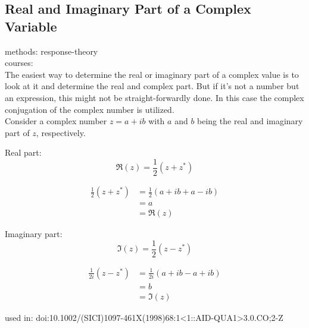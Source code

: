 \subsection{Real and Imaginary Part of a Complex Variable}

methods: {response-theory}\\
courses: {}\\

The easiest way to determine the real or imaginary part of a complex
value is to
look at it and determine the real and complex part. But if it's
not a number but an expression, this might not be straight-forwardly done.
In this case the complex conjugation of the complex number is utilized.\\

Consider a complex number $z = a +ib$ with $a$ and $b$ being the real and
imaginary part of $z$, respectively.

Real part:
\begin{equation}
 \Re(z) = \frac12 (z + z^*)
\end{equation}

\begin{align}
 \frac12 (z + z^*) &= \frac12 (a + ib + a - ib)\\
                   &= a\\
                   &= \Re(z)
\end{align}

Imaginary part:
\begin{equation}
 \Im(z) = \frac12 (z - z^*)
\end{equation}

\begin{align}
 \frac1{2i} (z - z^*) &= \frac1{2i} (a + ib - a + ib)\\
                      &= b\\
                      &= \Im(z)
\end{align}

\vspace{0.5cm}
used in: {doi:10.1002/(SICI)1097-461X(1998)68:1<1::AID-QUA1>3.0.CO;2-Z}
